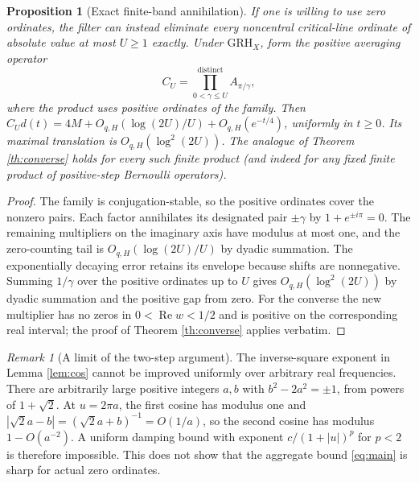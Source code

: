 \documentclass[11pt]{article}
\newtheorem{proposition}[theorem]{Proposition}
\theoremstyle{remark}\newtheorem{remark}[theorem]{Remark}
\newcommand{\Rea}{\operatorname{Re}}
\newcommand{\GRH}{\mathrm{GRH}}
\begin{document}
\begin{proposition}[Exact finite-band annihilation]\label{prop:targeted}
If one is willing to use zero ordinates, the filter can instead eliminate every noncentral critical-line ordinate of absolute value at most $U\ge1$ exactly. Under $\GRH_X$, form the positive averaging operator
\[
 C_U=\prod_{0<\gamma\le U}^{\mathrm{distinct}} A_{\pi/\gamma},
\]
where the product uses positive ordinates of the family. Then $C_U d(t)=4M+O_{q,H}(\log(2U)/U)+O_{q,H}(e^{-t/4})$, uniformly in $t\ge0$. Its maximal translation is $O_{q,H}(\log^2(2U))$. The analogue of Theorem \ref{th:converse} holds for every such finite product (and indeed for any fixed finite product of positive-step Bernoulli operators).
\end{proposition}
\begin{proof}
The family is conjugation-stable, so the positive ordinates cover the nonzero pairs. Each factor annihilates its designated pair $\pm\gamma$ by $1+e^{\pm i\pi}=0$. The remaining multipliers on the imaginary axis have modulus at most one, and the zero-counting tail is $O_{q,H}(\log(2U)/U)$ by dyadic summation. The exponentially decaying error retains its envelope because shifts are nonnegative. Summing $1/\gamma$ over the positive ordinates up to $U$ gives $O_{q,H}(\log^2(2U))$ by dyadic summation and the positive gap from zero. For the converse the new multiplier has no zeros in $0<\Rea w<1/2$ and is positive on the corresponding real interval; the proof of Theorem \ref{th:converse} applies verbatim.
\end{proof}

\begin{remark}[A limit of the two-step argument]
The inverse-square exponent in Lemma \ref{lem:cos} cannot be improved uniformly over arbitrary real frequencies. There are arbitrarily large positive integers $a,b$ with $b^2-2a^2=\pm1$, from powers of $1+\sqrt2$. At $u=2\pi a$, the first cosine has modulus one and $|\sqrt2a-b|=(\sqrt2a+b)^{-1}=O(1/a)$, so the second cosine has modulus $1-O(a^{-2})$. A uniform damping bound with exponent $c/(1+|u|)^p$ for $p<2$ is therefore impossible. This does not show that the aggregate bound \eqref{eq:main} is sharp for actual zero ordinates.
\end{remark}
\end{document}
